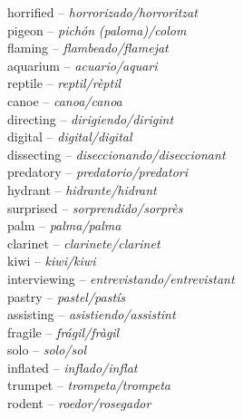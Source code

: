 \documentclass[output=paper,modfonts,nonflat,newtxmath]{langsci/langscibook}
\begin{document}
\begin{multicols}{2}
horrified  – \textit{horrorizado/horroritzat} \\
pigeon  – \textit{pichón} \textit{(paloma)/colom} \\
flaming  – \textit{flambeado/flamejat}\\
aquarium  – \textit{acuario/aquari} \\
reptile  – \textit{reptil/rèptil}\\
canoe  – \textit{canoa/canoa} \\
directing  – \textit{dirigiendo/dirigint} \\
digital  – \textit{digital/digital} \\
dissecting  – \textit{diseccionando/diseccionant}\\
predatory  – \textit{predatorio/predatori} \\
hydrant  – \textit{hidrante/hidrant} \\
surprised  – \textit{sorprendido/sorprès}\\
palm   – \textit{palma/palma} \\
clarinet  – \textit{clarinete/clarinet} \\
kiwi  – \textit{kiwi/kiwi} \\
interviewing – \textit{entrevistando/entrevistant} \\
pastry – \textit{pastel/pastís}\\
assisting  – \textit{asistiendo/assistint}  \\
fragile  – \textit{frágil/fràgil} \\
solo  – \textit{solo/sol} \\
inflated  – \textit{inflado/inflat} \\
trumpet  – \textit{trompeta/trompeta} \\
rodent  – \textit{roedor/rosegador}
\end{multicols}

{\sloppy\printbibliography[heading=subbibliography,notkeyword=this]}
\end{document}
